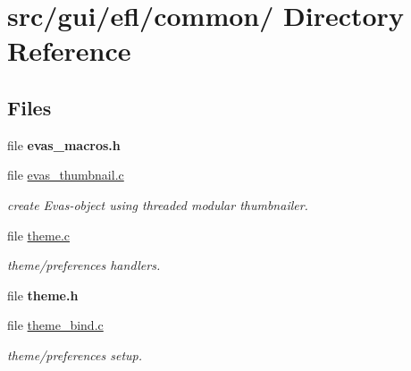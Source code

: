 \hypertarget{dir_000020}{
\section{src/gui/efl/common/ Directory Reference}
\label{dir_000020}
}
\subsection*{Files}
\begin{CompactItemize}
\item 
file {\bf evas\_\-macros.h}
\item 
file \hyperlink{evas__thumbnail_8c}{evas\_\-thumbnail.c}
\begin{CompactList}\small\item\em create Evas-object using threaded modular thumbnailer. \item\end{CompactList}

\item 
file \hyperlink{theme_8c}{theme.c}
\begin{CompactList}\small\item\em theme/preferences handlers. \item\end{CompactList}

\item 
file {\bf theme.h}
\item 
file \hyperlink{theme__bind_8c}{theme\_\-bind.c}
\begin{CompactList}\small\item\em theme/preferences setup. \item\end{CompactList}

\end{CompactItemize}
